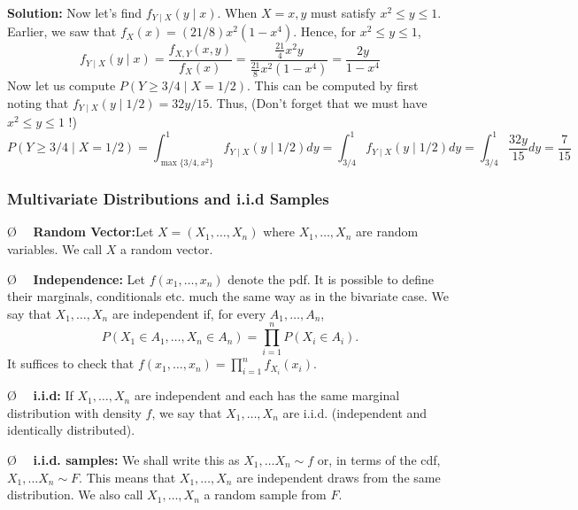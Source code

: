 \documentclass[13pt]{article}
\theoremstyle{definition}
\newenvironment{solution}
{\color{C2}\begin{framed}\begingroup\textbf{Solution:} }
  {\endgroup\end{framed}}
\theoremstyle{remark}
\newenvironment{remark}
  {\pushQED{\qed}\renewcommand{\qedsymbol}{$\triangle$}\remarkx}
  {\popQED\endremarkx}
\newenvironment{point}
  {\O~~}
  {}
\begin{document}
\begin{remark}
\begin{enumerate}
\begin{solution}
Now let's find $f_{Y \mid X}(y \mid x)$. When $X=x, y$ must satisfy $x^{2} \leq y \leq 1$. Earlier, we saw that $f_{X}(x)=(21 / 8) x^{2}\left(1-x^{4}\right)$. Hence, for $x^{2} \leq y \leq 1$,
$$
f_{Y \mid X}(y \mid x)=\frac{f_{X,Y}(x, y)}{f_{X}(x)}=\frac{\frac{21}{4} x^{2} y}{\frac{21}{8} x^{2}\left(1-x^{4}\right)}=\frac{2 y}{1-x^{4}}
$$
Now let us compute $P(Y \geq 3 / 4 \mid X=1 / 2)$. This can be computed by first noting that $f_{Y \mid X}(y \mid 1 / 2)=32 y / 15$. Thus, {\color{C3}(Don't forget that we must have $x^{2} \leq y \leq 1$ !)}
$$
P(Y \geq 3 / 4 \mid X=1 / 2)=\int_{\max\{3 / 4, x^2\}}^{1} f_{Y \mid X}(y \mid 1 / 2) d y=\int_{3 / 4}^{1} f_{Y \mid X}(y \mid 1 / 2) d y=\int_{3 / 4}^{1} \frac{32 y}{15} d y=\frac{7}{15}
$$
\end{solution}
    \end{enumerate}
\end{remark}

\subsubsection{Multivariate Distributions and i.i.d Samples}
\begin{point}
    \textbf{Random Vector:}Let $X=\left(X_{1}, \ldots, X_{n}\right)$ where $X_{1}, \ldots, X_{n}$ are random variables. We call $X$ a random vector. 
\end{point}

\begin{point}
    \textbf{Independence:} Let $f\left(x_{1}, \ldots, x_{n}\right)$ denote the pdf. It is possible to define their marginals, conditionals etc. much the same way as in the bivariate case. We say that $X_{1}, \ldots, X_{n}$ are independent if, for every $A_{1}, \ldots, A_{n}$,
$$
P\left(X_{1} \in A_{1}, \ldots, X_{n} \in A_{n}\right)=\prod_{i=1}^{n} P\left(X_{i} \in A_{i}\right) .
$$
It suffices to check that $f\left(x_{1}, \ldots, x_{n}\right)=\prod_{i=1}^{n} f_{X_{i}}\left(x_{i}\right)$. 
\end{point}


\begin{point}
    \textbf{i.i.d:} If $X_{1}, \ldots, X_{n}$ are independent and each has the same marginal distribution with density $f$, we say that $X_{1}, \ldots, X_{n}$ are i.i.d. (independent and identically distributed).
\end{point}

\begin{point}
    \textbf{i.i.d. samples:} We shall write this as $X_{1}, \ldots X_{n} \sim f$ or, in terms of the cdf, $X_{1}, \ldots X_{n} \sim F$. This means that $X_{1}, \ldots, X_{n}$ are independent draws from the same distribution. We also call $X_{1}, \ldots, X_{n}$ a random sample from $F$.
\end{point}
\end{document}
